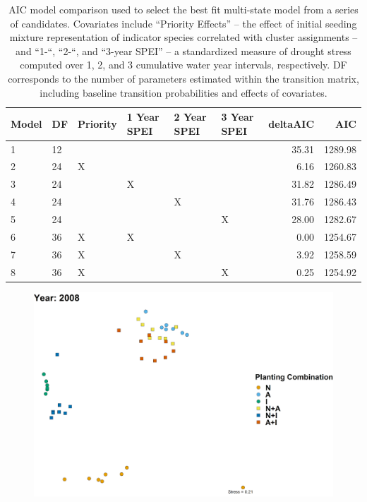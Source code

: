 \documentclass[twoside,12pt,final]{ucthesis-CA2012}
\begin{document}
\begin{ucmainmatter}
\begin{table}[ht]
\centering
\begin{tabular}{llllllrr}
  \hline
Model & DF & Priority & 1 Year SPEI & 2 Year SPEI & 3 Year SPEI & deltaAIC & AIC \\ 
  \hline
1 & 12 &  &  &  &  & 35.31 & 1289.98 \\ 
  2 & 24 & X &  &  &  & 6.16 & 1260.83 \\ 
  3 & 24 &  & X &  &  & 31.82 & 1286.49 \\ 
  4 & 24 &  &  & X &  & 31.76 & 1286.43 \\ 
  5 & 24 &  &  &  & X & 28.00 & 1282.67 \\ 
  6 & 36 & X & X &  &  & 0.00 & 1254.67 \\ 
  7 & 36 & X &  & X &  & 3.92 & 1258.59 \\ 
  8 & 36 & X &  &  & X & 0.25 & 1254.92 \\ 
   \hline
\end{tabular}
\caption{AIC model comparison used to select the best fit multi-state model from a series of candidates. Covariates include “Priority Effects” – the effect of initial seeding mixture representation of indicator species correlated with cluster assignments – and “1-“, “2-“, and “3-year SPEI” – a standardized measure of drought stress computed over 1, 2, and 3 cumulative water year intervals, respectively. DF corresponds to the number of parameters estimated within the transition matrix, including baseline transition probabilities and effects of covariates.} 
\end{table}
\begin{figure}
\centering
\includegraphics[width=\textwidth,height=0.5\textheight]{figure/AppFig3_1.png}

\end{figure}
\end{ucmainmatter}
\end{document}
